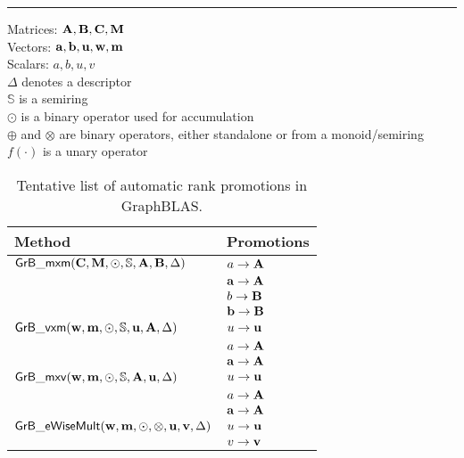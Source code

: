 \begin{table}[tb]
	\hrule
	\caption{Tentative list of automatic rank promotions in GraphBLAS.}
	\label{Tab:Promotions}
	Matrices: ${\bf A},{\bf B},{\bf C},{\bf M}$ \\
	Vectors: ${\bf a},{\bf b},{\bf u},{\bf w},{\bf m}$ \\
	Scalars: $a,b,u,v$ \\
	$\Delta$ denotes a descriptor \\
	$\mathbb{S}$ is a semiring \\
	$\odot$ is a binary operator used for accumulation \\
	$\oplus$ and $\otimes$ are binary operators, either standalone or from a monoid/semiring \\
	$f(\cdot)$ is a unary operator \\
	\begin{center}
		\begin{tabular}{|l|l|} \hline
			Method		& Promotions \\ \hline
			${\sf GrB\_mxm}({\bf C},{\bf M},\odot,\mathbb{S},{\bf A},{\bf B},\Delta)$	& $a \rightarrow {\bf A}$ \\
														& ${\bf a} \rightarrow {\bf A}$ \\
														& $b \rightarrow {\bf B}$ \\
														& ${\bf b} \rightarrow {\bf B}$ \\
			\hline
			${\sf GrB\_vxm}({\bf w},{\bf m},\odot,\mathbb{S},{\bf u},{\bf A},\Delta)$	& $u \rightarrow {\bf u}$ \\
														& $a \rightarrow {\bf A}$ \\
                                                                                                                & ${\bf a} \rightarrow {\bf A}$ \\
			\hline
			${\sf GrB\_mxv}({\bf w},{\bf m},\odot,\mathbb{S},{\bf A},{\bf u},\Delta)$	& $u \rightarrow {\bf u}$ \\
														& $a \rightarrow {\bf A}$ \\
                                                                                                                & ${\bf a} \rightarrow {\bf A}$ \\
			\hline
			${\sf GrB\_eWiseMult}({\bf w},{\bf m},\odot,\otimes,{\bf u},{\bf v},\Delta)$& $u \rightarrow {\bf u}$ \\
														& $v \rightarrow {\bf v}$ \\

\end{tabular}
\end{center}
\end{table}
